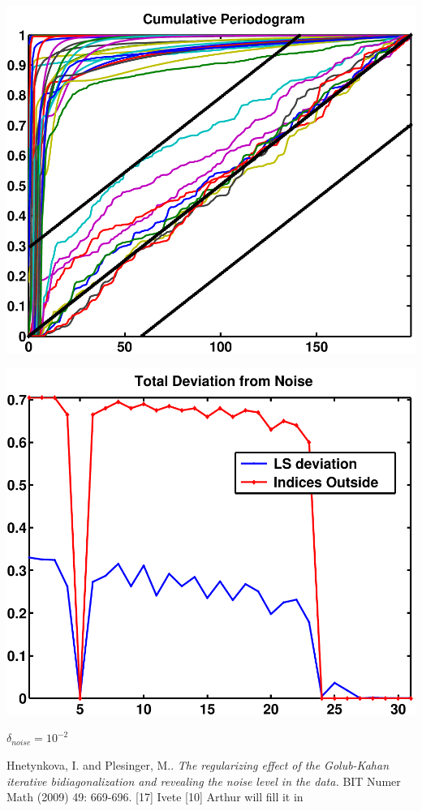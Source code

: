 \documentclass[11pt]{amsart}
\begin{document}
	\vspace{5mm}
	\begin{minipage}[t]{0.5\textwidth}
	
		\includegraphics[width=.95\linewidth]{figures/run4/cum_per} 
   
	\end{minipage}
	\begin{minipage}[t]{0.5\textwidth}
	
		\includegraphics[width=.95\linewidth]{figures/run4/total_deviation} 
   
	\end{minipage}
		\vspace{5mm}
		{\centering $\delta_{noise}=10^{-2}$}


\begin{thebibliography}{1}
    Hnetynkova, I. and Plesinger, M.. 
    \emph{The regularizing effect of the Golub-Kahan iterative bidiagonalization 
      and revealing the noise level in the data.}
      BIT Numer Math (2009) 49: 669-696.
     [17] Ivete
    [10] Arthur will fill it in
\end{thebibliography}
\end{document}
